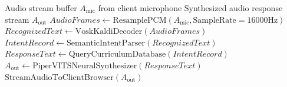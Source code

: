 \begin{algorithm}[H]
\caption{Offline Speech Recognition and Neural Voice Tutoring Pipeline}
\label{alg:ch3_voice_pipeline}
\begin{algorithmic}[1]
\REQUIRE Audio stream buffer $A_{\text{mic}}$ from client microphone
\ENSURE Synthesized audio response stream $A_{\text{out}}$
\STATE $AudioFrames \leftarrow \text{ResamplePCM}(A_{\text{mic}}, \text{SampleRate}=16000\text{Hz})$
\STATE $RecognizedText \leftarrow \text{VoskKaldiDecoder}(AudioFrames)$
\STATE $IntentRecord \leftarrow \text{SemanticIntentParser}(RecognizedText)$
\STATE $ResponseText \leftarrow \text{QueryCurriculumDatabase}(IntentRecord)$
\STATE $A_{\text{out}} \leftarrow \text{PiperVITSNeuralSynthesizer}(ResponseText)$
\STATE $\text{StreamAudioToClientBrowser}(A_{\text{out}})$
\end{algorithmic}
\end{algorithm}

